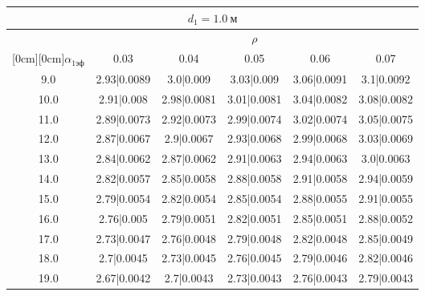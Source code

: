 \documentclass[20pt]{article}
\begin{document}
\begin{center}
\begin{tabular}{c|ccccc}
\hline
	\multicolumn{6}{c}{$d_{1}=1.0 \ м$} \\
\hline
	 & \multicolumn{5}{|c}{$\rho$} \\
	\cline{2-6}
	\raisebox{1.5ex}[0cm][0cm]{$\alpha_{1эф}$} & 0.03 & 0.04 & 0.05 & 0.06 & 0.07\\
\hline
	9.0 & 	2.93|0.0089 & 	3.0|0.009 & 	3.03|0.009 & 	3.06|0.0091 & 	3.1|0.0092\\
	10.0 & 	2.91|0.008 & 	2.98|0.0081 & 	3.01|0.0081 & 	3.04|0.0082 & 	3.08|0.0082\\
	11.0 & 	2.89|0.0073 & 	2.92|0.0073 & 	2.99|0.0074 & 	3.02|0.0074 & 	3.05|0.0075\\
	12.0 & 	2.87|0.0067 & 	2.9|0.0067 & 	2.93|0.0068 & 	2.99|0.0068 & 	3.03|0.0069\\
	13.0 & 	2.84|0.0062 & 	2.87|0.0062 & 	2.91|0.0063 & 	2.94|0.0063 & 	3.0|0.0063\\
	14.0 & 	2.82|0.0057 & 	2.85|0.0058 & 	2.88|0.0058 & 	2.91|0.0058 & 	2.94|0.0059\\
	15.0 & 	2.79|0.0054 & 	2.82|0.0054 & 	2.85|0.0054 & 	2.88|0.0055 & 	2.91|0.0055\\
	16.0 & 	2.76|0.005 & 	2.79|0.0051 & 	2.82|0.0051 & 	2.85|0.0051 & 	2.88|0.0052\\
	17.0 & 	2.73|0.0047 & 	2.76|0.0048 & 	2.79|0.0048 & 	2.82|0.0048 & 	2.85|0.0049\\
	18.0 & 	2.7|0.0045 & 	2.73|0.0045 & 	2.76|0.0045 & 	2.79|0.0046 & 	2.82|0.0046\\
	19.0 & 	2.67|0.0042 & 	2.7|0.0043 & 	2.73|0.0043 & 	2.76|0.0043 & 	2.79|0.0043\\
\end{tabular}


\end{center}
\end{document}

